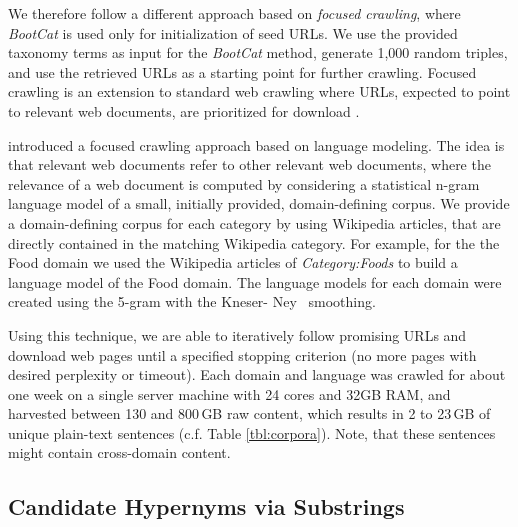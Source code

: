 \documentclass[11pt,letterpaper]{article}
\begin{document}
 We therefore follow a different  approach based on \emph{focused crawling}, where \textit{BootCat} is used only for initialization of seed URLs. We use the provided taxonomy terms as input for the \textit{BootCat} method, generate 1,000 random triples, and use the retrieved URLs as a starting point for further crawling. 
% 
 Focused crawling is an extension to standard web crawling where URLs, expected to point to relevant web documents, are prioritized for download \cite{chakrabarti:99}. 

  introduced a focused crawling approach based on language modeling. 
 The idea is that relevant web documents refer to other relevant web documents, where the relevance of a web document is computed by considering a statistical n-gram language model of a small, initially provided, domain-defining corpus.
 We provide a domain-defining corpus for each category by using Wikipedia articles, that are directly contained in the matching Wikipedia category. For example, for the  the Food domain we used the Wikipedia articles of \emph{Category:Foods} to build a language model of the Food domain. 
The language models for each domain were created using the \mbox{5-gram} with the Kneser- Ney~ smoothing.

%
 Using this technique, we are able to iteratively follow promising URLs and download web pages until a specified stopping criterion (no more pages with desired perplexity or timeout).
 Each domain and language was crawled for about one week on a single server machine with 24 cores and 32GB RAM, and harvested between 130 and 800\,GB raw content, which results in 2 to 23\,GB of unique plain-text sentences (c.f. Table \ref{tbl:corpora}). 
Note, that these sentences might contain cross-domain content. 
%
% 

\subsection{Candidate Hypernyms via Substrings}
\label{sec:step2}
\end{document}
